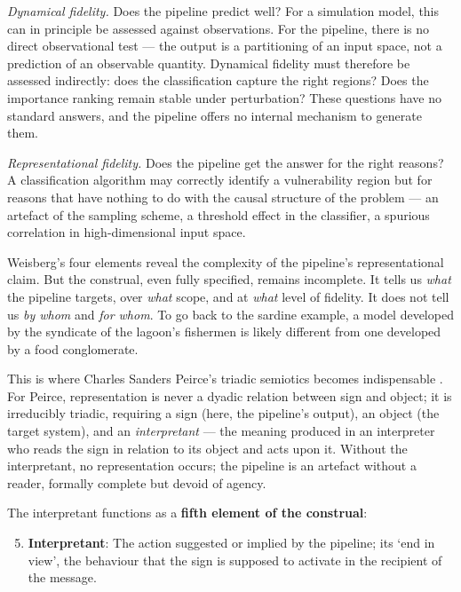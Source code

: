 \documentclass[sn-basic]{sn-jnl}%
\begin{document}
\textit{Dynamical fidelity.} Does the pipeline predict well? For a simulation model, this can in principle be assessed against observations. For the pipeline, there is no direct observational test --- the output is a partitioning of an input space, not a prediction of an observable quantity. Dynamical fidelity must therefore be assessed indirectly: does the classification capture the right regions? Does the importance ranking remain stable under perturbation? These questions have no standard answers, and the pipeline offers no internal mechanism to generate them.

\textit{Representational fidelity.} Does the pipeline get the answer for the right reasons? A classification algorithm may correctly identify a vulnerability region but for reasons that have nothing to do with the causal structure of the problem --- an artefact of the sampling scheme, a threshold effect in the classifier, a spurious correlation in high-dimensional input space. 

Weisberg's four elements reveal the complexity of the pipeline's representational claim. But the construal, even fully specified, remains incomplete. It tells us \textit{what} the pipeline targets, over \textit{what} scope, and at \textit{what} level of fidelity. It does not tell us \textit{by whom} and \textit{for whom}. To go back to the sardine example, a model developed by the syndicate of the lagoon's fishermen is likely different from one developed by a food conglomerate.

This is where Charles Sanders Peirce's triadic semiotics becomes indispensable \citep{saltelli_equations_2026, boulanger_elements_2014}. For Peirce, representation is never a dyadic relation between sign and object; it is irreducibly triadic, requiring a sign (here, the pipeline's output), an object (the target system), and an \textit{interpretant} --- the meaning produced in an interpreter who reads the sign in relation to its object and acts upon it. Without the interpretant, no representation occurs; the pipeline is an artefact without a reader, formally complete but devoid of agency.

The interpretant functions as a \textbf{fifth element of the construal}:

\begin{enumerate}
    \setcounter{enumi}{4}
    \item \textbf{Interpretant}: The action suggested or implied by the pipeline; its `end in view', the behaviour that the sign is supposed to activate in the recipient of the message.
\end{enumerate}
\end{document}
